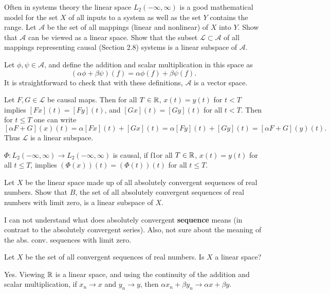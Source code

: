 \begin{problem}
	Often in systems theory the linear space $ L_2(-\infty,\infty) $ is a good mathematical model for the set $ X $ of all inputs to a system as well as the set $ Y $ contains the range. Let $ \mathcal{A} $ be the set of all mappings (linear and nonlinear) of $ X $ into $ Y $. Show that $ \mathcal{A} $ can be viewed as a linear space. Show that the subset $ \mathcal{L} \subset \mathcal{A} $ of all mappings representing causal (Section 2.8) systems is a linear subspace of $ \mathcal{A} $.
\end{problem}

\begin{solution}
	Let $ \phi,\psi \in \mathcal{A} $, and define the addition and scalar multiplication in this space as
	\[ (\alpha\phi + \beta \psi)(f) = \alpha \phi(f) + \beta\psi(f). \]
	It is straightforward to check that with these definitions, $ \mathcal{A} $ is a vector space.
	
	Let $ F, G \in \mathcal{L} $ be causal maps. Then for all $ T\in\mathbb{R} $, $ x(t) = y(t) $ for $ t <T $ implies $ [Fx](t) = [Fy](t) $, and $ [Gx](t) = [Gy](t) $ for all $ t<T $. Then for $ t\leq T $ one can write
	\[ [\alpha F + G](x)(t) = \alpha [Fx](t) + [Gx](t) = \alpha[Fy](t) + [Gy](t) = [\alpha F+G](y)(t). \]
	Thus $ \mathcal{L} $ is a linear subspace.
\end{solution}

\begin{remark}
	$ \Phi: L_2(-\infty,\infty) \to L_2(-\infty,\infty) $ is causal, if f1or all $ T\in \mathbb{R} $, $ x(t) = y(t) $ for all $ t\leq T $, implies $ (\Phi(x))(t) = (\Phi(t))(t) $ for all $ t\leq T $.
\end{remark}


\begin{problem}
	Let $ X $ be the linear space made up of all absolutely convergent sequences of real numbers. Show that $ B $, the set of all absolutely convergent sequences of real numbers with limit zero, is a linear subspace of $ X $.
\end{problem}
\begin{solution}
	I can not understand what does absolutely convergent \textbf{sequence} means (in contrast to the absolutely convergent series). Also, not sure about the meaning of the abs. conv. sequences with limit zero. 
\end{solution}



\begin{problem}
	Let $ X $ be the set of all convergent sequences of real numbers. Is $ X $ a linear space?
\end{problem}
\begin{solution}
	Yes. Viewing $ \mathbb{R} $ is a linear space, and using the continuity of the addition and scalar multiplication, if $ x_n\to x $ and $ y_n \to y $, then $ \alpha x_n + \beta y_n \to \alpha x+ \beta y $. 
\end{solution}



